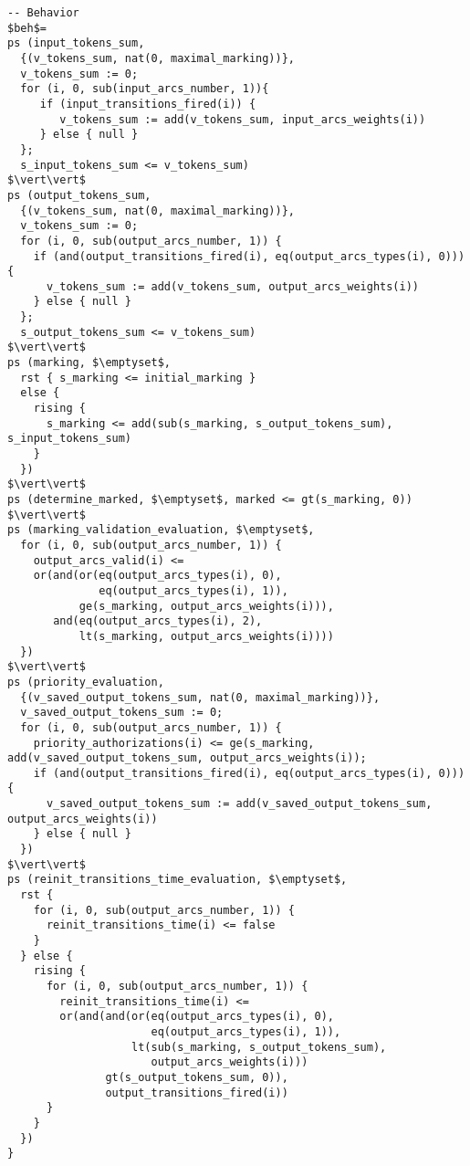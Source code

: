\begin{lstlisting}
-- Behavior  
$beh$=
ps (input_tokens_sum, 
  {(v_tokens_sum, nat(0, maximal_marking))},
  v_tokens_sum := 0;
  for (i, 0, sub(input_arcs_number, 1)){
     if (input_transitions_fired(i)) { 
        v_tokens_sum := add(v_tokens_sum, input_arcs_weights(i))
     } else { null }
  };
  s_input_tokens_sum <= v_tokens_sum)
$\vert\vert$
ps (output_tokens_sum, 
  {(v_tokens_sum, nat(0, maximal_marking))},
  v_tokens_sum := 0;
  for (i, 0, sub(output_arcs_number, 1)) {
    if (and(output_transitions_fired(i), eq(output_arcs_types(i), 0))) {
      v_tokens_sum := add(v_tokens_sum, output_arcs_weights(i))
    } else { null }
  };
  s_output_tokens_sum <= v_tokens_sum)
$\vert\vert$    
ps (marking, $\emptyset$,
  rst { s_marking <= initial_marking }
  else {
    rising {
      s_marking <= add(sub(s_marking, s_output_tokens_sum), s_input_tokens_sum)
    }
  })
$\vert\vert$
ps (determine_marked, $\emptyset$, marked <= gt(s_marking, 0))
$\vert\vert$  
ps (marking_validation_evaluation, $\emptyset$,
  for (i, 0, sub(output_arcs_number, 1)) {
    output_arcs_valid(i) <= 
    or(and(or(eq(output_arcs_types(i), 0),
              eq(output_arcs_types(i), 1)),
           ge(s_marking, output_arcs_weights(i))),
       and(eq(output_arcs_types(i), 2),
           lt(s_marking, output_arcs_weights(i))))
  })
$\vert\vert$
ps (priority_evaluation, 
  {(v_saved_output_tokens_sum, nat(0, maximal_marking))},
  v_saved_output_tokens_sum := 0;
  for (i, 0, sub(output_arcs_number, 1)) {
    priority_authorizations(i) <= ge(s_marking, add(v_saved_output_tokens_sum, output_arcs_weights(i));
    if (and(output_transitions_fired(i), eq(output_arcs_types(i), 0))) {
      v_saved_output_tokens_sum := add(v_saved_output_tokens_sum, output_arcs_weights(i))
    } else { null }
  })
$\vert\vert$      
ps (reinit_transitions_time_evaluation, $\emptyset$,
  rst { 
    for (i, 0, sub(output_arcs_number, 1)) {
      reinit_transitions_time(i) <= false
    }
  } else {
    rising {
      for (i, 0, sub(output_arcs_number, 1)) {
        reinit_transitions_time(i) <=
        or(and(and(or(eq(output_arcs_types(i), 0),
                      eq(output_arcs_types(i), 1)),
                   lt(sub(s_marking, s_output_tokens_sum),
                      output_arcs_weights(i)))
               gt(s_output_tokens_sum, 0)),
               output_transitions_fired(i))
      }
    }
  })
}
\end{lstlisting}

